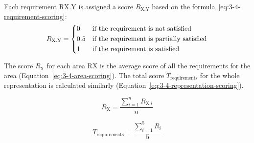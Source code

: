 Each requirement RX.Y is assigned a score $R_{\text{X.Y}}$ based on the formula~\ref{eq:3-4-requirement-scoring}:
\begin{equation}
    R_{\text{X.Y}} =
    \begin{dcases}
        0   & \text{if the requirement is not satisfied}\\
        0.5 & \text{if the requirement is partially satisfied}\\
        1   & \text{if the requirement is satisfied}
    \end{dcases}
    \label{eq:3-4-requirement-scoring}
\end{equation}

The score $R_{\text{X}}$ for each area RX is the average score of all the requirements for the area (Equation~\ref{eq:3-4-area-scoring}).
The total score $T_{\text{requirements}}$ for the whole representation is calculated similarly (Equation~\ref{eq:3-4-representation-scoring}).

\begin{equation}
    R_{\text{X}} = \frac{\sum_{i=1}^{n} R_{\text{X.$i$}}}{n}
    \label{eq:3-4-area-scoring}
\end{equation}

\begin{equation}
    T_{\text{requirements}} = \frac{\sum_{i=1}^{5} R_i}{5}
    \label{eq:3-4-representation-scoring}
\end{equation}

